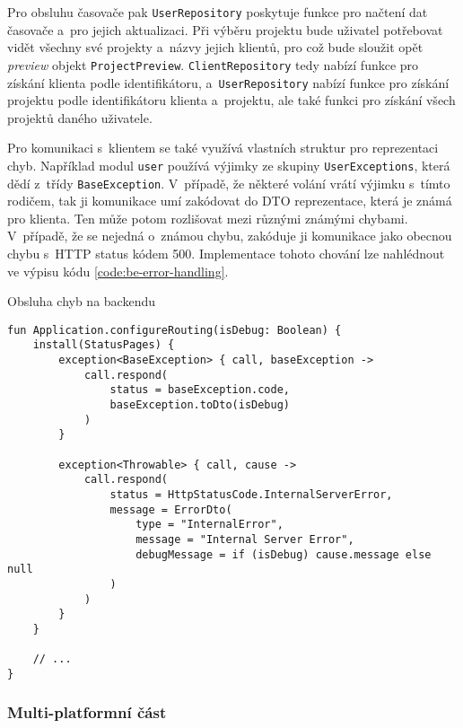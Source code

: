 Pro obsluhu časovače pak \texttt{UserRepository} poskytuje funkce pro načtení dat časovače a~pro jejich aktualizaci. Při výběru projektu bude uživatel potřebovat vidět všechny své projekty a~názvy jejich klientů, pro což bude sloužit opět \emph{preview} objekt \texttt{ProjectPreview}. \texttt{ClientRepository} tedy nabízí funkce pro získání klienta podle identifikátoru, a~\texttt{UserRepository} nabízí funkce pro získání projektu podle identifikátoru klienta a~projektu, ale také funkci pro získání všech projektů daného uživatele.

Pro komunikaci s~klientem se také využívá vlastních struktur pro reprezentaci chyb. Například modul \texttt{user} používá výjimky ze skupiny \texttt{UserExceptions}, která dědí z~třídy \texttt{BaseException}. V~případě, že některé volání vrátí výjimku s~tímto rodičem, tak ji komunikace umí zakódovat do DTO reprezentace, která je známá pro klienta. Ten může potom rozlišovat mezi různými známými chybami. V~případě, že se nejedná o~známou chybu, zakóduje ji komunikace jako obecnou chybu s~HTTP status kódem 500. Implementace tohoto chování lze nahlédnout ve výpisu kódu \ref{code:be-error-handling}.

\begin{listing}
\caption{Obsluha chyb na backendu}\label{code:be-error-handling}
\begin{verbatim}
fun Application.configureRouting(isDebug: Boolean) {
    install(StatusPages) {
        exception<BaseException> { call, baseException ->
            call.respond(
                status = baseException.code,
                baseException.toDto(isDebug)
            )
        }

        exception<Throwable> { call, cause ->
            call.respond(
                status = HttpStatusCode.InternalServerError,
                message = ErrorDto(
                    type = "InternalError",
                    message = "Internal Server Error",
                    debugMessage = if (isDebug) cause.message else null
                )
            )
        }
    }
    
    // ...
}
\end{verbatim}
\end{listing}

\subsubsection{Multi-platformní část}

